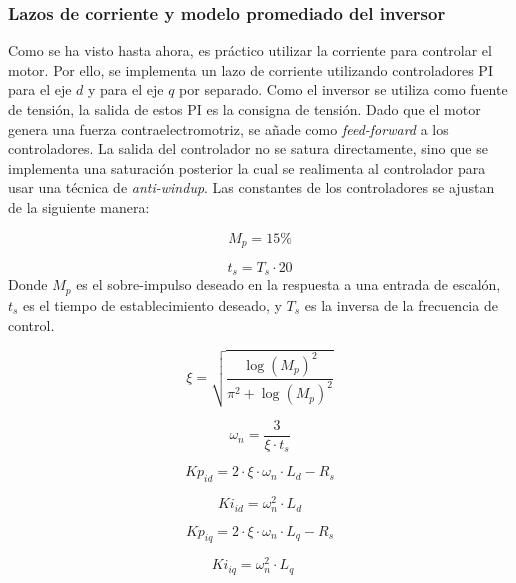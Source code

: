 \subsubsection{Lazos de corriente y modelo promediado del inversor}

Como se ha visto hasta ahora, es práctico utilizar la corriente para controlar el motor. Por ello, se implementa un lazo de corriente utilizando controladores PI para el eje $d$ y para el eje $q$ por separado. Como el inversor se utiliza como fuente de tensión, la salida de estos PI es la consigna de tensión. Dado que el motor genera una fuerza contraelectromotriz, se añade como \textit{feed-forward} a los controladores. La salida del controlador no se satura directamente, sino que se implementa una saturación posterior la cual se realimenta al controlador para usar una técnica de \textit{anti-windup}. Las constantes de los controladores se ajustan de la siguiente manera:

\[
M_p = 15 \%
\]

\[
 t_s = T_s \cdot 20
\]
Donde $M_p$ es el sobre-impulso deseado en la respuesta a una entrada de escalón, $t_s$ es el tiempo de establecimiento deseado, y $T_s$ es la inversa de la frecuencia de control.

\[
\xi = \sqrt{\frac{\log(M_p)^2}{\pi^2 + \log(M_p)^2}}
\]

\[
\omega_n = \frac{3}{\xi \cdot t_s}
\]

\[
Kp_{id} = 2 \cdot \xi \cdot \omega_n \cdot L_d - R_s
\]

\[
Ki_{id} = \omega_n^2 \cdot L_d
\]

\[
Kp_{iq} = 2 \cdot \xi \cdot \omega_n \cdot L_q - R_s
\]

\[
Ki_{iq} = \omega_n^2 \cdot L_q \quad
\]

